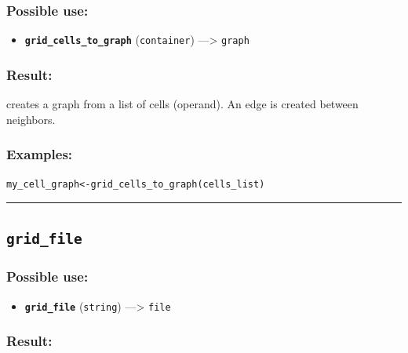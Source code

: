 \documentclass[]{book}
\providecommand{\tightlist}{%
  \setlength{\itemsep}{0pt}\setlength{\parskip}{0pt}}
\theoremstyle{definition}
\theoremstyle{definition}
\theoremstyle{definition}
\theoremstyle{remark}
\begin{document}
\subsubsection{Possible use:}\label{possible-use-242}

\begin{itemize}
\tightlist
\item
  \textbf{\texttt{grid\_cells\_to\_graph}} (\texttt{container})
  ---\textgreater{} \texttt{graph}
\end{itemize}

\subsubsection{Result:}\label{result-233}

creates a graph from a list of cells (operand). An edge is created
between neighbors.

\subsubsection{Examples:}\label{examples-183}

\begin{verbatim}
my_cell_graph<-grid_cells_to_graph(cells_list) 
\end{verbatim}

\begin{center}\rule{0.5\linewidth}{\linethickness}\end{center}

\subsection{\texorpdfstring{\texttt{grid\_file}}{grid\_file}}\label{grid_file}

\subsubsection{Possible use:}\label{possible-use-243}

\begin{itemize}
\tightlist
\item
  \textbf{\texttt{grid\_file}} (\texttt{string}) ---\textgreater{}
  \texttt{file}
\end{itemize}

\subsubsection{Result:}\label{result-234}
\end{document}
